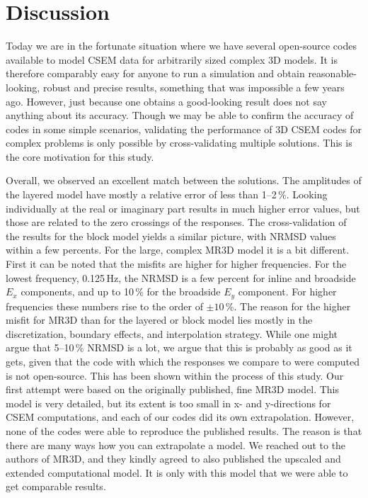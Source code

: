 \documentclass[
    paper,
  ]{geophysics}
\begin{document}
\section{Discussion}

Today we are in the fortunate situation where we have several open-source codes available to model CSEM data for arbitrarily sized complex 3D models. It is therefore comparably easy for anyone to run a simulation and obtain reasonable-looking, robust and precise results, something that was impossible a few years ago. However, just because one obtains a good-looking result does not say anything about its accuracy. Though we may be able to confirm the accuracy of codes in some simple scenarios, validating the performance of 3D CSEM codes for complex problems is only possible by cross-validating multiple solutions. This is the core motivation for this study.

Overall, we observed an excellent match between the solutions. The amplitudes of the layered model have mostly a relative error of less than 1--2\,\%. Looking individually at the real or imaginary part results in much higher error values, but those are related to the zero crossings of the responses. The cross-validation of the results for the block model yields a similar picture, with NRMSD values within a few percents. For the large, complex MR3D model it is a bit different. First it can be noted that the misfits are higher for higher frequencies. For the lowest frequency, 0.125\,Hz, the NRMSD is a few percent for inline and broadside $E_x$ components, and up to 10\,\% for the broadside $E_y$ component. For higher frequencies these numbers rise to the order of $\pm10\,$\%. The reason for the higher misfit for MR3D than for the layered or block model lies mostly in the discretization, boundary effects, and interpolation strategy. While one might argue that 5--10\,\% NRMSD is a lot, we argue that this is probably as good as it gets, given that the code with which the responses we compare to were computed is not open-source. This has been shown within the process of this study. Our first attempt were based on the originally published, fine MR3D model. This model is very detailed, but its extent is too small in x- and y-directions for CSEM computations, and each of our codes did its own extrapolation. However, none of the codes were able to reproduce the published results. The reason is that there are many ways how you can extrapolate a model. We reached out to the authors of MR3D, and they kindly agreed to also published the upscaled and extended computational model. It is only with this model that we were able to get comparable results.
\end{document}
